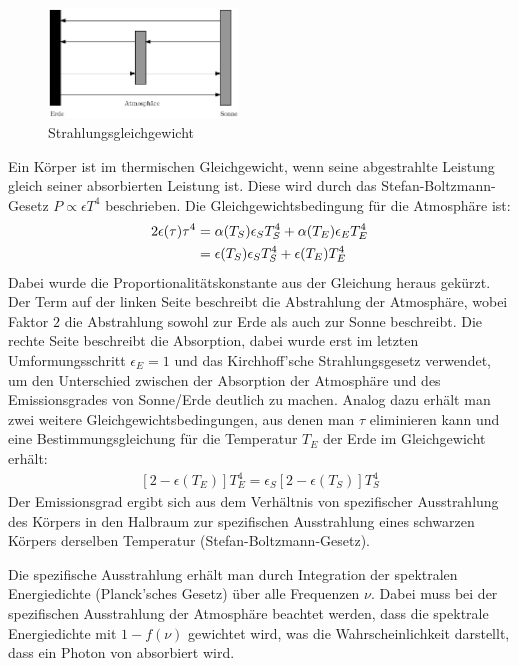 \documentclass[10pt,a4paper]{article}
\begin{document}
\begin{figure}
\centering
\includegraphics[width=0.45\textwidth]{./figures/strahlungsgleichgewicht.eps}
\caption{Strahlungsgleichgewicht}
\label{fig:strahlungsgleichgewicht}
\end{figure}
Ein Körper ist im thermischen Gleichgewicht, wenn seine abgestrahlte Leistung
gleich seiner absorbierten Leistung ist. Diese wird durch das Stefan-Boltzmann-Gesetz
$P \propto \epsilon T^4$ beschrieben. Die Gleichgewichtsbedingung für die Atmosphäre ist:
\begin{align}
	2\epsilon(\tau)\tau^4 &= \alpha(T_S) \epsilon_S T_S^4 + \alpha(T_E) \epsilon_E T_E^4 \notag \\ &=\epsilon(T_S) \epsilon_S T_S^4 + \epsilon(T_E) T_E^4
\end{align}
Dabei wurde die Proportionalitätskonstante aus der Gleichung heraus gekürzt.
Der Term auf der linken Seite beschreibt die Abstrahlung der Atmosphäre, wobei
Faktor $2$ die Abstrahlung sowohl zur Erde als auch zur Sonne beschreibt.
Die rechte Seite beschreibt die Absorption, dabei wurde erst im letzten
Umformungsschritt $\epsilon_E = 1$ und das Kirchhoff'sche Strahlungsgesetz verwendet,
um den Unterschied zwischen der Absorption der Atmosphäre und des Emissionsgrades von
Sonne/Erde deutlich zu machen.
Analog dazu erhält man zwei weitere Gleichgewichtsbedingungen, aus denen man
$\tau$ eliminieren kann und eine Bestimmungsgleichung für die Temperatur $T_E$
der Erde im Gleichgewicht erhält:
\begin{align}
\left[2-\epsilon(T_E)\right]T_E^4=\epsilon_S\left[2-\epsilon(T_S)\right]T_S^4
\label{eqn:gleichgewicht}
\end{align}
Der Emissionsgrad ergibt sich aus dem Verhältnis von spezifischer Ausstrahlung des Körpers in den Halbraum zur spezifischen Ausstrahlung eines schwarzen Körpers derselben Temperatur (Stefan-Boltzmann-Gesetz). 

Die spezifische Ausstrahlung erhält man durch Integration der spektralen Energiedichte (Planck'sches Gesetz) über alle Frequenzen $\nu$. Dabei muss bei der spezifischen Ausstrahlung der Atmosphäre beachtet werden, dass die spektrale Energiedichte mit $1-f(\nu)$ gewichtet wird, was die Wahrscheinlichkeit darstellt, dass ein Photon von  absorbiert wird.
\end{document}
